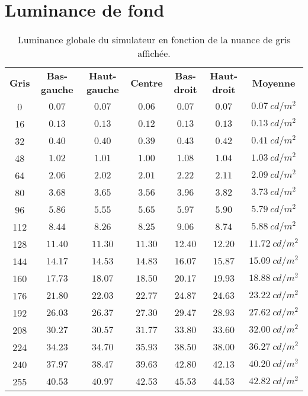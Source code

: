 	\section*{Luminance de fond}
	\begin{table}[h]	
		\centering
		\caption{Luminance globale du simulateur en fonction de la nuance de gris affichée.}
		\label{tab:mesure_luminance_fond}
		\small
		\begin{tabular}{ccccccc}
			\textbf{Gris} & \textbf{Bas-gauche} & \textbf{Haut-gauche} & \textbf{Centre} & \textbf{Bas-droit} & \textbf{Haut-droit} & \textbf{Moyenne}\\
			0 & $0.07$ & $0.07$ & $0.06$ & $0.07$ & $0.07$ & $0.07~cd/m^2$\\
			16 & $0.13$ & $0.13$ & $0.12$ & $0.13$ & $0.13$ & $0.13~cd/m^2$\\
			32 & $0.40$ & $0.40$ & $0.39$ & $0.43$ & $0.42$ & $0.41~cd/m^2$\\
			48 & $1.02$ & $1.01$ & $1.00$ & $1.08$ & $1.04$ & $1.03~cd/m^2$\\
			64 & $2.06$ & $2.02$ & $2.01$ & $2.22$ & $2.11$ & $2.09~cd/m^2$\\
			80 & $3.68$ & $3.65$ & $3.56$ & $3.96$ & $3.82$ & $3.73~cd/m^2$\\
			96 & $5.86$ & $5.55$ & $5.65$ & $5.97$ & $5.90$ & $5.79~cd/m^2$\\
			112 & $8.44$ & $8.26$ & $8.25$ & $9.06$ & $8.74$ & $5.88~cd/m^2$\\
			128 & $11.40$ & $11.30$ & $11.30$ & $12.40$ & $12.20$ & $11.72~cd/m^2$\\
			144 & $14.17$ & $14.53$ & $14.83$ & $16.07$ & $15.87$ & $15.09~cd/m^2$\\
			160 & $17.73$ & $18.07$ & $18.50$ & $20.17$ & $19.93$ & $18.88~cd/m^2$\\
			176 & $21.80$ & $22.03$ & $22.77$ & $24.87$ & $24.63$ & $23.22~cd/m^2$\\
			192 & $26.03$ & $26.37$ & $27.30$ & $29.47$ & $28.93$ & $27.62~cd/m^2$\\
			208 & $30.27$ & $30.57$ & $31.77$ & $33.80$ & $33.60$ & $32.00~cd/m^2$\\
			224 & $34.23$ & $34.70$ & $35.93$ & $38.50$ & $38.00$ & $36.27~cd/m^2$\\
			240 & $37.97$ & $38.47$ & $39.63$ & $42.80$ & $42.13$ & $40.20~cd/m^2$\\
			255 & $40.53$ & $40.97$ & $42.53$ & $45.53$ & $44.53$ & $42.82~cd/m^2$\\
		\end{tabular}
	\end{table}
	
